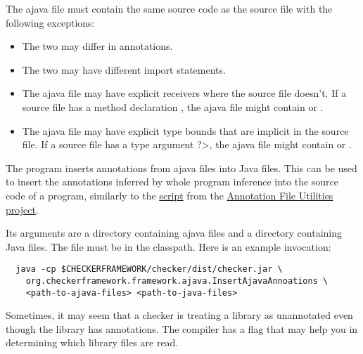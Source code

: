 
The
ajava file must contain the same source code as the source file with the following exceptions:
\begin{itemize}
  \item The two may differ in annotations.
  \item The two may have different import statements.
  \item The ajava file may have explicit receivers where the source file
    doesn't. If a source file has a method declaration , the ajava file might contain  or .
  \item The ajava file may have explicit type bounds that are implicit in the source file.
    If a source file has a type argument \<?>,
    the ajava file might contain  or .
\end{itemize}



The  program inserts annotations
from ajava files into Java files.  This can be used to
insert the annotations inferred by whole program inference into the source code
of a program, similarly to the
\href{https://checkerframework.org/annotation-file-utilities/#insert-annotations-to-source}{
  script} from the
\href{https://checkerframework.org/annotation-file-utilities/}{Annotation
  File Utilities project}.

Its arguments are a directory containing ajava files and a directory
containing Java files.  The  file must be in the classpath.
Here is an example invocation:
\begin{Verbatim}
  java -cp $CHECKERFRAMEWORK/checker/dist/checker.jar \
    org.checkerframework.framework.ajava.InsertAjavaAnnoations \
    <path-to-ajava-files> <path-to-java-files>
\end{Verbatim}



Sometimes, it may seem that a checker is treating a library as unannotated
even though the library has annotations.  The compiler has a flag that
may help you in determining which library files are read.


